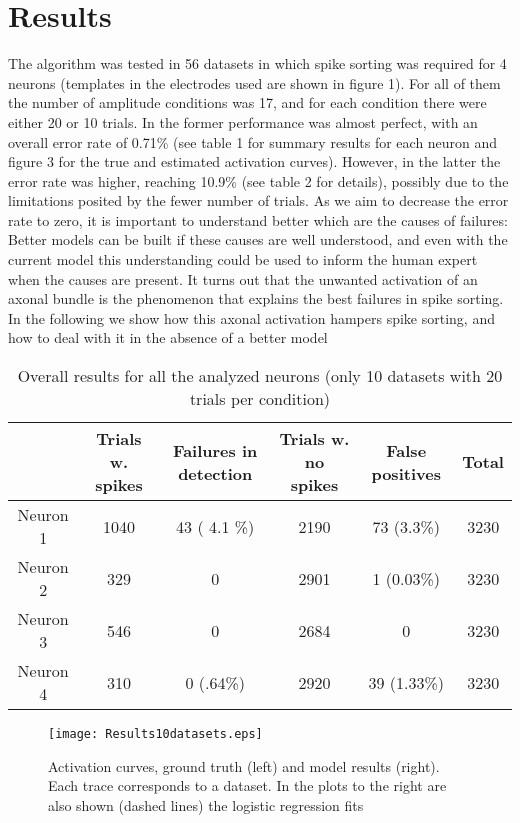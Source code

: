     \section{Results}
    The algorithm was tested in 56 datasets in which spike sorting was required for 4 neurons (templates in the electrodes used are shown in figure 1). For all of them the number of amplitude conditions was 17, and for each condition there were either 20 or 10 trials. In the former performance was almost perfect, with an overall error rate of 0.71\% (see table 1 for summary results for each neuron and figure 3 for the true and estimated activation curves). However, in the latter the error rate was higher, reaching 10.9\% (see table 2 for details), possibly due to the limitations posited by the fewer number of trials. As we aim to decrease the error rate to zero, it is important to understand better which are the causes of failures: Better models can be built if these causes are well understood, and even with the current model this understanding could be used to inform the human expert when the causes are present. It turns out that the unwanted activation of an axonal bundle is the phenomenon that explains the best failures in spike sorting. In the following we show how this axonal activation hampers spike sorting, and how to deal with it in the absence of a better model
    \begin{table}[h!]
\begin{tabular}{|c|c|c|c|c|c|}
\hline
   &  Trials w. spikes & Failures in detection & Trials w. no spikes & False positives  & Total \\ \hline
   Neuron 1 & 1040 & 43 ( 4.1 \%)& 2190 & 73 (3.3\%) & 3230 \\ \hline
   Neuron 2 & 329 & 0 & 2901 & 1 (0.03\%)  & 3230 \\ \hline
   Neuron 3 & 546 & 0 & 2684 & 0 & 3230  \\ \hline
   Neuron 4 & 310 & 0 (.64\%) & 2920 & 39 (1.33\%) & 3230  \\
  \hline
\end{tabular}
\caption{Overall results for all the analyzed neurons (only 10 datasets with 20 trials per condition)}
\end{table}
\begin{figure}[h!]
          \centering
                \texttt{[image: Results10datasets.eps]} 
                \caption{Activation curves, ground truth (left) and model results (right). Each trace corresponds to a dataset. In the  plots  to the right are also shown (dashed lines) the logistic regression fits}\end{figure}

